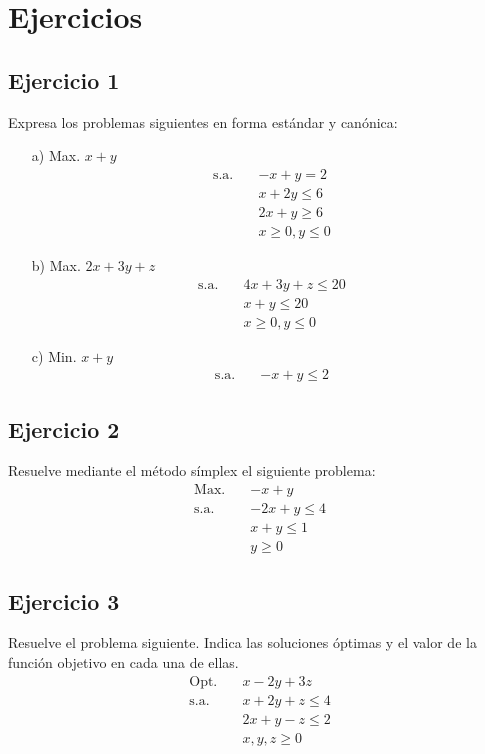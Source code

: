 \section{Ejercicios}

\subsection*{Ejercicio 1}
Expresa los problemas siguientes en forma estándar y canónica:
\begin{itemize}
    \item[a)] Max. $x + y$
    \begin{align*}
        \text{s.a.} \quad & -x + y = 2 \\
        & x + 2y \leq 6 \\
        & 2x + y \geq 6 \\
        & x \geq 0, y \leq 0
    \end{align*}

    
    \item[b)] Max. $2x + 3y + z$
    \begin{align*}
        \text{s.a.} \quad & 4x + 3y + z \leq 20 \\
        & x + y \leq 20 \\
        & x \geq 0, y \leq 0
    \end{align*}
    
    \item[c)] Min. $x + y$
    \begin{align*}
        \text{s.a.} \quad & -x + y \leq 2
    \end{align*}
\end{itemize}

\subsection*{Ejercicio 2}
Resuelve mediante el método símplex el siguiente problema:
\begin{align*}
    \text{Max.} \quad & -x + y \\
    \text{s.a.} \quad & -2x + y \leq 4 \\
    & x + y \leq 1 \\
    & y \geq 0
\end{align*}

\subsection*{Ejercicio 3}
Resuelve el problema siguiente. Indica las soluciones óptimas y el valor de la función objetivo en cada una de ellas.
\begin{align*}
    \text{Opt.} \quad & x - 2y + 3z \\
    \text{s.a.} \quad & x + 2y + z \leq 4 \\
    & 2x + y - z \leq 2 \\
    & x, y, z \geq 0
\end{align*}

